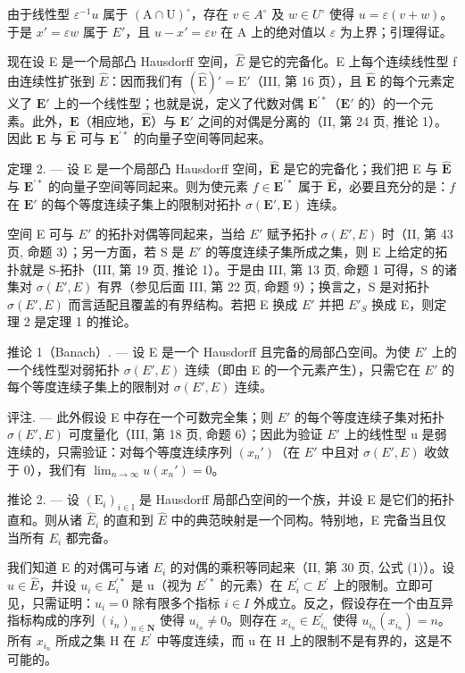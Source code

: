由于线性型 \(\varepsilon^{-1}u\) 属于 \((\mathrm{A}\cap\mathrm{U})^{\circ}\)，存在 \(v\in A^{\circ}\) 及 \(w\in U^{\circ}\) 使得 \(u=\varepsilon(v+w)\)。于是 \(x'=\varepsilon w\) 属于 \(E'\)，且 \(u-x'=\varepsilon v\) 在 A 上的绝对值以 \(\varepsilon\) 为上界；引理得证。

现在设 E 是一个局部凸 Hausdorff 空间，\(\hat{E}\) 是它的完备化。E 上每个连续线性型 f 由连续性扩张到 \(\hat{E}\)：因而我们有 \((\hat{\mathrm{E}})' = \mathrm{E}'\)（III, 第 16 页），且 \(\hat{\mathbf{E}}\) 的每个元素定义了 \(\mathbf{E}'\) 上的一个线性型；也就是说，定义了代数对偶 \(\mathbf{E}^{\prime *}\)（\(\mathbf{E}'\) 的）的一个元素。此外，\(\mathbf{E}\)（相应地，\(\hat{\mathbf{E}}\)）与 \(\mathbf{E}'\) 之间的对偶是分离的（II, 第 24 页, 推论 1）。因此 \(\mathbf{E}\) 与 \(\hat{\mathbf{E}}\) 可与 \(\mathbf{E}^{\prime *}\) 的向量子空间等同起来。

定理 2. --- 设 E 是一个局部凸 Hausdorff 空间，\(\hat{\mathbf{E}}\) 是它的完备化；我们把 E 与 \(\hat{\mathbf{E}}\) 与 \(\mathbf{E}^{\prime *}\) 的向量子空间等同起来。则为使元素 \(f \in \mathbf{E}^{\prime *}\) 属于 \(\hat{\mathbf{E}}\)，必要且充分的是：\(f\) 在 \(\mathbf{E}'\) 的每个等度连续子集上的限制对拓扑 \(\sigma(\mathbf{E}', \mathbf{E})\) 连续。

空间 E 可与 \(E'\) 的拓扑对偶等同起来，当给 \(E'\) 赋予拓扑 \(\sigma(E', E)\) 时（II, 第 43 页, 命题 3）；另一方面，若 S 是 \(E'\) 的等度连续子集所成之集，则 E 上给定的拓扑就是 S-拓扑（III, 第 19 页, 推论 1）。于是由 III, 第 13 页, 命题 1 可得，S 的诸集对 \(\sigma(E', E)\) 有界（参见后面 III, 第 22 页, 命题 9）；换言之，S 是对拓扑 \(\sigma(E', E)\) 而言适配且覆盖的有界结构。若把 E 换成 \(E'\) 并把 \(E'_{S}\) 换成 E，则定理 2 是定理 1 的推论。

推论 1（Banach）. --- 设 E 是一个 Hausdorff 且完备的局部凸空间。为使 \(E'\) 上的一个线性型对弱拓扑 \(\sigma(E', E)\) 连续（即由 E 的一个元素产生），只需它在 \(E'\) 的每个等度连续子集上的限制对 \(\sigma(E', E)\) 连续。

评注. --- 此外假设 E 中存在一个可数完全集；则 \(E'\) 的每个等度连续子集对拓扑 \(\sigma(E', E)\) 可度量化（III, 第 18 页, 命题 6）；因此为验证 \(E'\) 上的线性型 u 是弱连续的，只需验证：对每个等度连续序列 \((x_{n}')\)（在 \(E'\) 中且对 \(\sigma(E', E)\) 收敛于 0），我们有 \(\lim_{n \to \infty} u(x_{n}') = 0\)。

推论 2. --- 设 \((\mathrm{E}_{i})_{i\in\mathbb{I}}\) 是 Hausdorff 局部凸空间的一个族，并设 E 是它们的拓扑直和。则从诸 \(\hat{E}_{i}\) 的直和到 \(\hat{E}\) 中的典范映射是一个同构。特别地，E 完备当且仅当所有 \(E_{i}\) 都完备。

我们知道 E 的对偶可与诸 \(E_{i}\) 的对偶的乘积等同起来（II, 第 30 页, 公式 (1)）。设 \(u \in \hat{E}\)，并设 \(u_{i} \in E_{i}^{\prime *}\) 是 u（视为 \(E^{\prime *}\) 的元素）在 \(E_{i}^{\prime} \subset E^{\prime}\) 上的限制。立即可见，只需证明：\(u_{i} = 0\) 除有限多个指标 \(i \in I\) 外成立。反之，假设存在一个由互异指标构成的序列 \((i_{n})_{n \in \mathbf{N}}\) 使得 \(u_{i_{n}} \neq 0\)。则存在 \(x_{i_{n}} \in E_{i_{n}}^{\prime}\) 使得 \(u_{i_{n}}(x_{i_{n}}) = n\)。所有 \(x_{i_{n}}\) 所成之集 H 在 \(E^{\prime}\) 中等度连续，而 u 在 H 上的限制不是有界的，这是不可能的。

